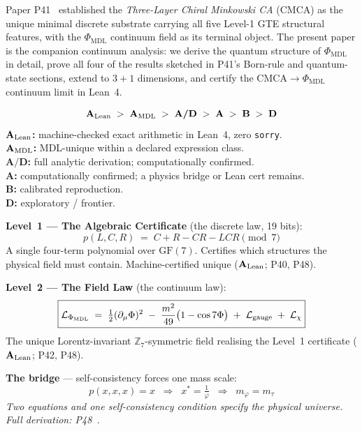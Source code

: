 \documentclass[11pt]{article}
\theoremstyle{remark}
\newcommand{\PHIMDL}{\Phi_{\mathrm{MDL}}}
\newcommand{\ZS}{\mathbb{Z}_7}
\newcommand{\CatA}{\textbf{A}}
\newcommand{\CatAL}{\ensuremath{\textbf{A}_{\rm Lean}}}
\newcommand{\CatAMDL}{\ensuremath{\textbf{A}_{\rm MDL}}}
\newcommand{\CatAD}{\textbf{A/D}}
\newcommand{\CatB}{\textbf{B}}
\newcommand{\CatD}{\textbf{D}}
\begin{document}
Paper P41~\cite{SpivackCMCA} established the \emph{Three-Layer Chiral
Minkowski CA} (CMCA) as the unique minimal discrete substrate carrying all
five Level-1 GTE structural features, with the $\PHIMDL$ continuum field as
its terminal object.  The present paper is the companion continuum analysis:
we derive the quantum structure of $\PHIMDL$ in detail, prove all four of the
results sketched in P41's Born-rule and quantum-state sections, extend to
$3+1$ dimensions, and certify the CMCA$\to\PHIMDL$ continuum limit in Lean~4.

\medskip

\begin{tcolorbox}[colback=gray!4,colframe=gray!50!black,
  title={\textbf{Claim-strength taxonomy}},
  fonttitle=\bfseries,left=6pt,right=6pt,top=5pt,bottom=5pt]
\small
\[
\CatAL \;>\; \CatAMDL \;>\; \CatAD \;>\; \CatA \;>\; \CatB \;>\; \CatD
\]
\textbf{$\CatAL$:} machine-checked exact arithmetic in Lean~4, zero \texttt{sorry}.\\
\textbf{$\CatAMDL$:} MDL-unique within a declared expression class.\\
\textbf{$\CatAD$:} full analytic derivation; computationally confirmed.\\
\textbf{$\CatA$:} computationally confirmed; a physics bridge or Lean cert remains.\\
\textbf{$\CatB$:} calibrated reproduction.\\
\textbf{$\CatD$:} exploratory / frontier.
\end{tcolorbox}

\begin{tcolorbox}[colback=green!4,colframe=green!55!black,
  title={\textbf{The Two Laws: One Framework, Two Levels}},
  fonttitle=\small\bfseries, left=8pt, right=8pt, top=6pt, bottom=6pt,
  breakable]
\small

\medskip\noindent
\textbf{Level~1 --- The Algebraic Certificate} (the discrete law, 19 bits):
\[
  \boxed{p(L,C,R) \;=\; C + R - CR - LCR \pmod{7}}
\]
A single four-term polynomial over $\mathrm{GF}(7)$.
Certifies which structures the physical field must contain.
Machine-certified unique (\CatAL; P40, P48).

\medskip\noindent
\textbf{Level~2 --- The Field Law} (the continuum law):
\[
  \boxed{\mathcal{L}_{\PHIMDL} \;=\; \tfrac{1}{2}(\partial_\mu\Phi)^2
    \;-\;\frac{m^2}{49}\bigl(1 - \cos 7\Phi\bigr)
    \;+\;\mathcal{L}_{\rm gauge}\;+\;\mathcal{L}_\chi}
\]
The unique Lorentz-invariant $\ZS$-symmetric field realising the
Level~1 certificate (\CatAL; P42, P48).

\medskip\noindent
\textbf{The bridge} --- self-consistency forces one mass scale:
\[
  \boxed{p(x,x,x) = x \;\;\Longrightarrow\;\; x^* = \tfrac{1}{\varphi}
    \;\;\Longrightarrow\;\; m_\varphi = m_\tau}
\]
\emph{Two equations and one self-consistency condition specify the physical universe.
Full derivation: P48~\cite{SpivackGTECompleteFramework}.}
\end{tcolorbox}
\end{document}
